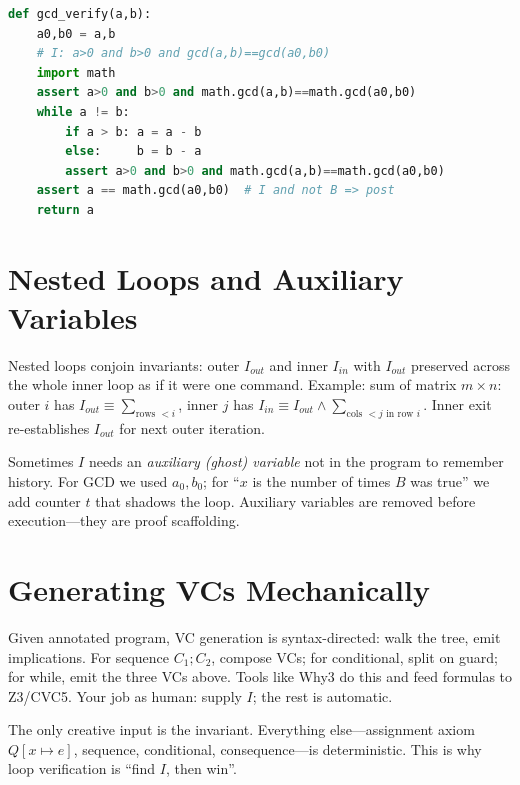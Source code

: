 \begin{lstlisting}[language=Python, caption={Euclid with ghost variables to state the invariant: $a_0,b_0$ never change but appear in $I$.}, label={lst:euclid-py}]
def gcd_verify(a,b):
    a0,b0 = a,b
    # I: a>0 and b>0 and gcd(a,b)==gcd(a0,b0)
    import math
    assert a>0 and b>0 and math.gcd(a,b)==math.gcd(a0,b0)
    while a != b:
        if a > b: a = a - b
        else:     b = b - a
        assert a>0 and b>0 and math.gcd(a,b)==math.gcd(a0,b0)
    assert a == math.gcd(a0,b0)  # I and not B => post
    return a
\end{lstlisting}

\section{Nested Loops and Auxiliary Variables}
\label{sec:nested}
Nested loops conjoin invariants: outer $I_{out}$ and inner $I_{in}$ with $I_{out}$ preserved across the whole inner loop as if it were one command. Example: sum of matrix $m\times n$: outer $i$ has $I_{out}\equiv \sum_{\text{rows }<i}$, inner $j$ has $I_{in}\equiv I_{out}\land \sum_{\text{cols }<j\text{ in row }i}$. Inner exit re-establishes $I_{out}$ for next outer iteration.

Sometimes $I$ needs an \emph{auxiliary (ghost) variable} not in the program to remember history. For GCD we used $a_0,b_0$; for ``$x$ is the number of times $B$ was true'' we add counter $t$ that shadows the loop. Auxiliary variables are removed before execution—they are proof scaffolding.

\section{Generating VCs Mechanically}
\label{sec:vc-gen}
Given annotated program, VC generation is syntax-directed: walk the tree, emit implications. For sequence $C_1;C_2$, compose VCs; for conditional, split on guard; for while, emit the three VCs above. Tools like Why3 do this and feed formulas to Z3/CVC5. Your job as human: supply $I$; the rest is automatic.

\begin{remark}
The only creative input is the invariant. Everything else—assignment axiom $Q[x\mapsto e]$, sequence, conditional, consequence—is deterministic. This is why loop verification is ``find $I$, then win''.
\end{remark}

